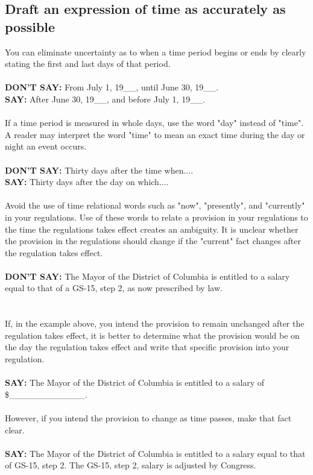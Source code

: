 \documentclass[12pt, letterpaper]{report}
\begin{document}
\begin{linenumbers}
            \subsection{Draft an expression of time as accurately as possible} 
            You can eliminate uncertainty as to when a time period begins or ends by clearly stating the first and last days of that period.\\\\
            \textbf{DON'T SAY:} From July 1, 19\_\_, until June 30, 19\_\_.\\
            \textbf{SAY:} After June 30, 19\_\_, and before July 1, 19\_\_.\\\\
            If a time period is measured in whole days, use the word "day" instead of "time". A reader may interpret the word "time" to mean an exact time during the day or night an event occurs.\\\\
            \textbf{DON'T SAY:} Thirty days after the time when....\\
            \textbf{SAY:} Thirty days after the day on which....\\\\
            Avoid the use of time relational words such as "now", "presently", and "currently" in your regulations. Use of these words to relate a provision in your regulations to the time the regulations takes effect creates an ambiguity. It is unclear whether the provision in the regulations should change if the "current" fact changes after the regulation takes effect.\\\\
            \textbf{DON'T SAY:} The Mayor of the District of Columbia is entitled to a salary equal to that of a GS-15, step 2, as now prescribed by law.\\\\
            [You know what the Mayor's salary is on the day the regulation takes effect but what salary does the Mayor receive if Congress changes the pay rate for a GS-15 one week, one month, or one year after the regulation takes effect?]\\
            If, in the example above, you intend the provision to remain unchanged after the regulation takes effect, it is better to determine what the provision would be on the day the regulation takes effect and write that specific provision into your regulation.\\\\
            \textbf{SAY:} The Mayor of the District of Columbia is entitled to a salary of \$\_\_\_\_\_\_\_\_\_\_\_\_.\\\\
            However, if you intend the provision to change as time passes, make that fact clear.\\\\
            \textbf{SAY:} The Mayor of the District of Columbia is entitled to a salary equal to that of GS-15, step 2. The GS-15, step 2, salary is adjusted by Congress.

\end{linenumbers}
\end{document}
